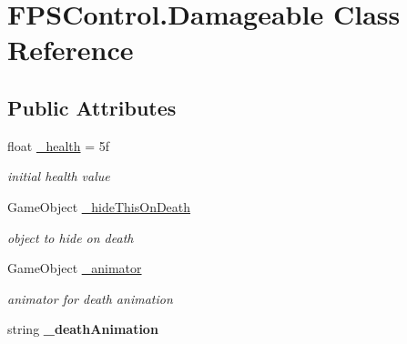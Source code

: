 \hypertarget{class_f_p_s_control_1_1_damageable}{\section{F\-P\-S\-Control.\-Damageable Class Reference}
\label{class_f_p_s_control_1_1_damageable}
}
\subsection*{Public Attributes}
\begin{DoxyCompactItemize}
\item 
\hypertarget{class_f_p_s_control_1_1_damageable_a11f503756f2714dd0cec419866acdecc}{float \hyperlink{class_f_p_s_control_1_1_damageable_a11f503756f2714dd0cec419866acdecc}{\-\_\-health} = 5f}\label{class_f_p_s_control_1_1_damageable_a11f503756f2714dd0cec419866acdecc}

\begin{DoxyCompactList}\small\item\em initial health value \end{DoxyCompactList}\item 
\hypertarget{class_f_p_s_control_1_1_damageable_a9eda798017c37b408f9bd0e87a0f962b}{Game\-Object \hyperlink{class_f_p_s_control_1_1_damageable_a9eda798017c37b408f9bd0e87a0f962b}{\-\_\-hide\-This\-On\-Death}}\label{class_f_p_s_control_1_1_damageable_a9eda798017c37b408f9bd0e87a0f962b}

\begin{DoxyCompactList}\small\item\em object to hide on death \end{DoxyCompactList}\item 
\hypertarget{class_f_p_s_control_1_1_damageable_a5ab020187454918577465753232b431f}{Game\-Object \hyperlink{class_f_p_s_control_1_1_damageable_a5ab020187454918577465753232b431f}{\-\_\-animator}}\label{class_f_p_s_control_1_1_damageable_a5ab020187454918577465753232b431f}

\begin{DoxyCompactList}\small\item\em animator for death animation \end{DoxyCompactList}\item 
\hypertarget{class_f_p_s_control_1_1_damageable_ad4685d60d02619bc666779978bc3ff57}{string {\bfseries \-\_\-death\-Animation}}\label{class_f_p_s_control_1_1_damageable_ad4685d60d02619bc666779978bc3ff57}


\end{DoxyCompactItemize}
